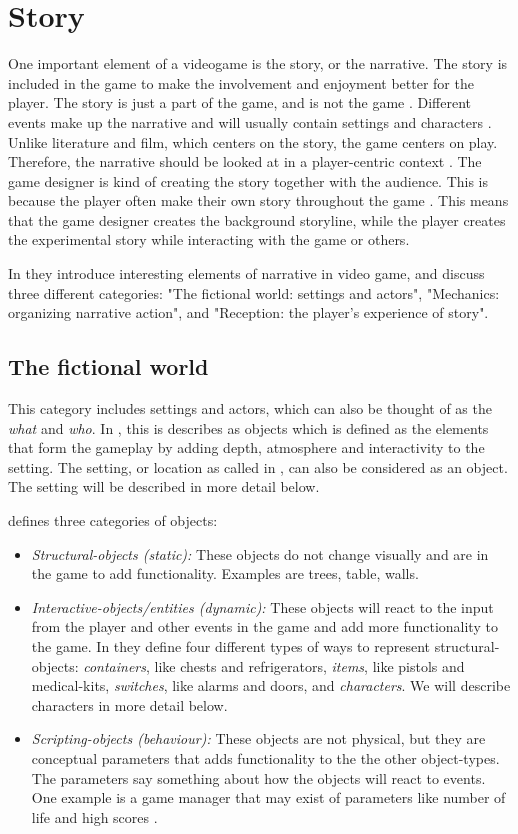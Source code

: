 \section{Story}
One important element of a videogame is the story, or the narrative. The story is included in the game to make the involvement and enjoyment better for the player. The story is just a part of the game, and is not the game \cite{umlapproach}.  Different events make up the narrative and will usually contain settings and characters \cite{understandingvg}. Unlike literature and film, which centers on the story, the game centers on play. Therefore, the narrative should be looked at in a player-centric context \cite{gametheory}. The game designer is kind of creating the story together with the audience. This is because the player often make their own story throughout the game \cite{umlapproach}. This means that the game designer creates the background storyline, while the player creates the experimental story while interacting with the game or others. 

In \cite{understandingvg} they introduce interesting elements of narrative in video game, and discuss three different categories: "The fictional world: settings and actors", "Mechanics: organizing narrative action", and "Reception: the player’s experience of story".

\subsection{The fictional world}
This category includes settings and actors, which can also be thought of as the \emph{what} and \emph{who}. In \cite{beram}, this is describes as objects which is defined as the elements that form the gameplay by adding depth, atmosphere and interactivity to the setting. The setting, or location as called in \cite{beram}, can also be considered as an object. The setting will be described in more detail below.

\cite{beram} defines three categories of objects:
\begin{itemize}
\item \emph{Structural-objects (static):} These objects do not change visually and are in the game to add functionality. Examples are trees, table, walls.
\item \emph{Interactive-objects/entities (dynamic):} These objects will react to the input from the player and other events in the game and add more functionality to the game. In \cite{beram} they define four different types of ways to represent structural-objects: \emph{containers}, like chests and refrigerators, \emph{items}, like pistols and medical-kits, \emph{switches}, like alarms and doors, and \emph{characters}. We will describe characters in more detail below. 
\item \emph{Scripting-objects (behaviour):} These objects are not physical, but they are conceptual parameters that adds functionality to the the other object-types. The parameters say something about how the objects will react to events. One example is a game manager that may exist of parameters like number of life and high scores \cite{umlapproach}. 
\end{itemize}

